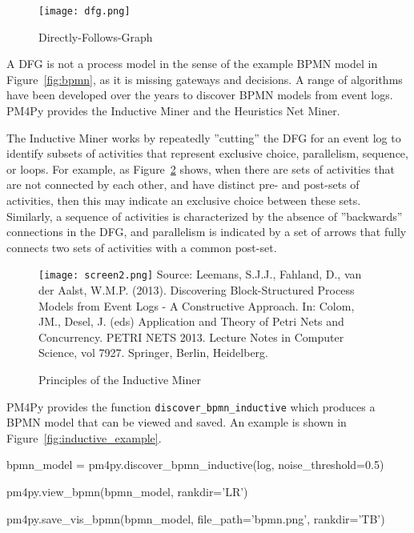 \begin{figure}
\centering
\texttt{[image: dfg.png]}
\caption{Directly-Follows-Graph}
\label{fig:dfg}
\end{figure}

A DFG is not a process model in the sense of the example BPMN model in Figure~\ref{fig:bpmn}, as it is missing gateways and decisions. A range of algorithms have been developed over the years to discover BPMN models from event logs. PM4Py provides the Inductive Miner and the Heuristics Net Miner. 

The Inductive Miner works by repeatedly ''cutting'' the DFG for an event log to identify subsets of activities that represent exclusive choice, parallelism, sequence, or loops. For example, as Figure~\ref{fig:inductive} shows, when there are sets of activities that are not connected by each other, and have distinct pre- and post-sets of activities, then this may indicate an exclusive choice between these sets. Similarly, a sequence of activities is characterized by the absence of ''backwards'' connections in the DFG, and parallelism is indicated by a set of arrows that fully connects two sets of activities with a common post-set. 

\begin{figure}
\texttt{[image: screen2.png]}
\scriptsize 
Source: Leemans, S.J.J., Fahland, D., van der Aalst, W.M.P. (2013). Discovering Block-Structured Process Models from Event Logs - A Constructive Approach. In: Colom, JM., Desel, J. (eds) Application and Theory of Petri Nets and Concurrency. PETRI NETS 2013. Lecture Notes in Computer Science, vol 7927. Springer, Berlin, Heidelberg.
\caption{Principles of the Inductive Miner}
\label{fig:inductive}
\end{figure}

PM4Py provides the function \texttt{discover\_bpmn\_inductive} which produces a BPMN model that can be viewed and saved. An example is shown in Figure~\ref{fig:inductive_example}.

\begin{samepage}
\begin{pythoncode}
bpmn_model = pm4py.discover_bpmn_inductive(log, noise_threshold=0.5)

pm4py.view_bpmn(bpmn_model, rankdir='LR')

pm4py.save_vis_bpmn(bpmn_model, file_path='bpmn.png', rankdir='TB')
\end{pythoncode}
\end{samepage}

